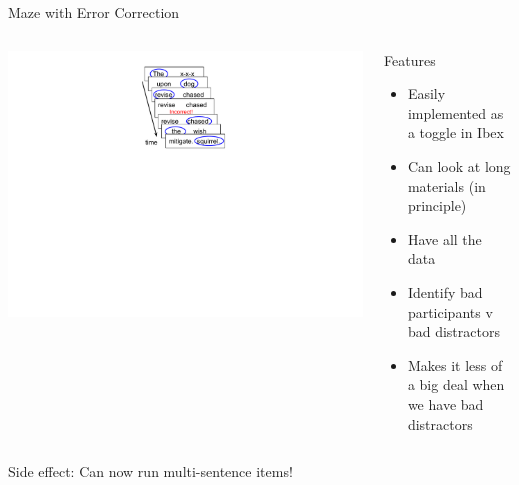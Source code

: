 \documentclass[12pt, xcolor=beamer,table,usenames,dvipsnames, ignorenonframetext, ngerman]{beamer}
\begin{document}
\begin{frame}{Maze with Error Correction}

\begin{columns}
	\begin{column}{0.3\textwidth}
		\begin{center}
		\includegraphics[clip, trim=9cm 12.5cm 10cm 1cm,width=\textwidth]{../maze_diagram.pdf}
		\end{center}
		
	\end{column} \pause 
	\begin{column}{0.7\textwidth} 
		\begin{center}
			Features
			\begin{itemize}
				\item Easily implemented as a toggle in Ibex \pause
				\item Can look at long materials (in principle)
				\item Have all the data \pause
				\item Identify bad participants v bad distractors 
				\item Makes it less of a big deal when we have bad distractors
			\end{itemize}
		\end{center}
	\end{column}
\end{columns}
\medskip
\pause

Side effect: Can now run multi-sentence items!
\end{frame}
%
\end{document}

